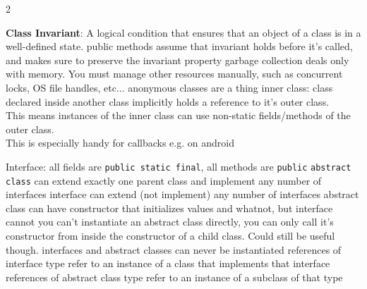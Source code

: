 \documentclass{article}
\def \columncount {2}
\renewcommand\labelitemi{\hspace{-1in}\tiny$\bullet$}
\renewcommand\labelitemii{\labelitemi}
\newcommand{\codesize}{8.5}
\newcommand{\java}[1]{{\fontsize{\codesize}{\codesize}\selectfont\texttt{#1}}}
\begin{document}
\begin{multicols}{\columncount}
\begin{outline}[longenum]


  \1 \textbf{Class Invariant}: A logical condition that ensures that an object of a class is in a well-defined state.
    \2 public methods assume that invariant holds before it's called, and makes sure to preserve the invariant property
  \1 garbage collection deals only with memory. You must manage other resources manually, such as concurrent locks, OS file handles, etc...
  \1 anonymous classes are a thing
  \1 inner class:
    class declared inside another class implicitly holds a reference to it's outer class. 
    \\ This means instances of the inner class can use non-static fields/methods of the outer class.
    \\ This is especially handy for callbacks e.g. on android

\zzz{\java{abstract class} vs \java{interface}}
  \1 Interface: all fields are \java{public static final}, all methods are \java{public}
  \1 \java{abstract class} can extend exactly one parent class and implement any number of interfaces
  \1 interface can extend (not implement) any number of interfaces
  \1 abstract class can have constructor that initializes values and whatnot, but interface cannot
    \2 you can't instantiate an abstract class directly, you can only call it's constructor from inside the constructor of a child class. Could still be useful though.
  \1 interfaces and abstract classes can never be instantiated
    \2 references of interface type refer to an instance of a class that implements that interface
    \2 references of abstract class type refer to an instance of a subclass of that type


\end{outline}
\end{multicols}
\end{document}
